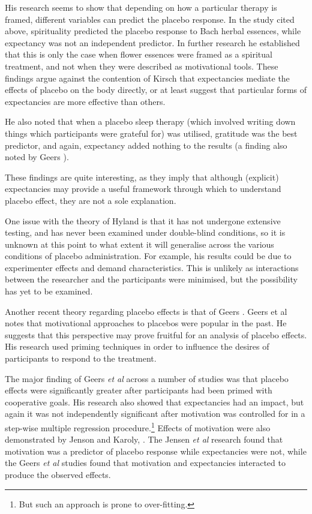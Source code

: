 His research seems to show that depending on how a particular therapy is framed, different variables can predict the placebo response.  In the study cited above, spirituality predicted the placebo response to Bach herbal essences, while expectancy was not an independent predictor. In further research \cite{Hyland2007} he established that this is only the case when flower essences were framed as a spiritual treatment, and not when they were described as motivational tools. These findings argue against the contention of Kirsch that expectancies mediate the effects of placebo on the body directly, or at least suggest that particular forms of expectancies are more effective than others. 

He also noted that when a placebo sleep therapy (which involved writing down things which participants were grateful for) was utilised, gratitude was the best predictor, and again, expectancy added nothing to the results (a finding also noted by Geers \cite{Geers2005}). 

These findings are quite interesting, as they imply that although (explicit) expectancies may provide a useful framework through which to understand placebo effect, they are not a sole explanation. 


One issue with the theory of Hyland is that it has not undergone extensive testing, and has never been examined under double-blind conditions, so it is unknown at this point to what extent it will generalise across the various conditions of placebo administration. For example, his results could be due to experimenter effects and demand characteristics. This is  unlikely as interactions between the researcher and the participants were minimised, but the possibility has yet to be examined. 

Another recent theory regarding placebo effects is that of Geers \cite{Geers2005a}. Geers et al notes that  motivational approaches to placebos were popular in the past.  He suggests that this perspective may prove fruitful for an analysis of placebo effects.   His research used priming techniques in order to influence the desires of  participants to respond to the treatment. 

The major finding of Geers \textit{et al} across a number of studies \cite{Geers2007,Geers2005a} was that placebo effects were significantly greater after participants had been primed with cooperative goals. His research also showed that expectancies had an impact, but again it was not independently significant after motivation was controlled for in a step-wise multiple regression procedure.\footnote{But such an approach is prone to over-fitting.} Effects of motivation were also demonstrated by Jenson and Karoly, \cite{Jensen1991}. The Jensen \textit{et al }   research found that motivation was a predictor of placebo response while expectancies were not, while the Geers \textit{et al } studies found that motivation and expectancies interacted to produce the observed effects.

